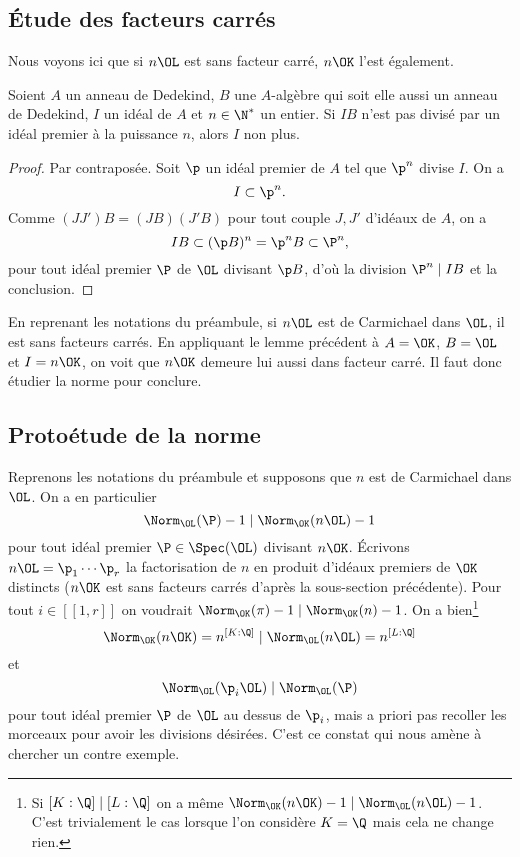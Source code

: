 \documentclass[a4paper, 12pt, oneside]{article}
\begin{document}
\subsection{Étude des facteurs carrés}

Nous voyons ici que si $n\OL$ est sans facteur carré, $n\OK$ l'est également.

\begin{lemme}Soient $A$ un anneau de Dedekind, $B$ une $A$-algèbre qui soit elle aussi un anneau de Dedekind, $I$ un idéal de $A$ et $n\in \N^*$ un entier. Si $IB$ n'est pas divisé par un idéal premier à la puissance $n$, alors $I$ non plus.
\end{lemme}

\begin{proof}
	Par contraposée. Soit $\p$ un idéal premier de $A$ tel que $\p^n$ divise $I$. On a $$I \subset \p^n.$$ Comme $(JJ')B = (JB)(J'B)$ pour tout couple $J, J'$ d'idéaux de $A$, on a $$IB \subset (\p B)^n = \p^n B \subset \P^n,$$ pour tout idéal premier $\P$ de $\OL$ divisant $\p B$, d'où la division $\P^n \mid IB$ et la conclusion.
\end{proof}

En reprenant les notations du préambule, si $n\OL$ est de Carmichael dans $\OL$, il est sans facteurs carrés. En appliquant le lemme précédent à $A=\OK$, $B=\OL$ et $I = n\OK$, on voit que $n\OK$ demeure lui aussi dans facteur carré. Il faut donc étudier la norme pour conclure.

\subsection{Protoétude de la norme}

Reprenons les notations du préambule et supposons que $n$ est de Carmichael dans $\OL$. On a en particulier $$\Norm_\OL(\P) - 1 \mid \Norm_\OK(n\OL) - 1$$ pour tout idéal premier $\P\in \Spec(\OL)$ divisant $n\OK$. Écrivons $n\OL = \p_1\cdots \p_r$ la factorisation de $n$ en produit d'idéaux premiers de $\OK$ distincts ($n\OK$ est sans facteurs carrés d'après la sous-section précédente). Pour tout $i\in [\![1, r]\!]$ on voudrait $\Norm_\OK(\pi) - 1\mid \Norm_\OK(n) - 1$. On a bien\footnote{Si $[K : \Q]\mid [L:\Q]$ on a même $\Norm_\OK(n\OK) - 1\mid \Norm_\OL(n\OL) - 1$. C'est trivialement le cas lorsque l'on considère $K=\Q$ mais cela ne change rien.} $$\Norm_\OK(n\OK) = n^{[K : \Q]} \mid \Norm_\OL(n\OL) = n^{[L : \Q]}$$ et $$\Norm_\OL(\p_i \OL) \mid \Norm_\OL(\P)$$ pour tout idéal premier $\P$ de $\OL$ au dessus de $\p_i$, mais a priori pas recoller les morceaux pour avoir les divisions désirées. C'est ce constat qui nous amène à chercher un contre exemple.
\end{document}
